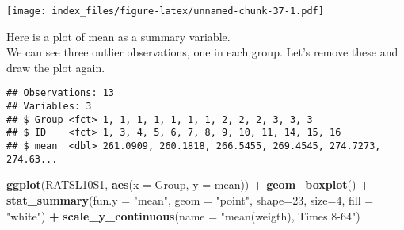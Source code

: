 \documentclass[]{article}
\newenvironment{Shaded}{\begin{snugshade}}{\end{snugshade}}
\newcommand{\KeywordTok}[1]{\textcolor[rgb]{0.13,0.29,0.53}{\textbf{#1}}}
\newcommand{\DataTypeTok}[1]{\textcolor[rgb]{0.13,0.29,0.53}{#1}}
\newcommand{\DecValTok}[1]{\textcolor[rgb]{0.00,0.00,0.81}{#1}}
\newcommand{\StringTok}[1]{\textcolor[rgb]{0.31,0.60,0.02}{#1}}
\newcommand{\CommentTok}[1]{\textcolor[rgb]{0.56,0.35,0.01}{\textit{#1}}}
\newcommand{\OperatorTok}[1]{\textcolor[rgb]{0.81,0.36,0.00}{\textbf{#1}}}
\newcommand{\NormalTok}[1]{#1}
\begin{document}
\texttt{[image: index\_files/figure-latex/unnamed-chunk-37-1.pdf]}

Here is a plot of mean as a summary variable.\\
We can see three outlier observations, one in each group. Let's remove
these and draw the plot again.

\begin{Shaded}
\end{Shaded}

\begin{verbatim}
## Observations: 13
## Variables: 3
## $ Group <fct> 1, 1, 1, 1, 1, 1, 1, 2, 2, 2, 3, 3, 3
## $ ID    <fct> 1, 3, 4, 5, 6, 7, 8, 9, 10, 11, 14, 15, 16
## $ mean  <dbl> 261.0909, 260.1818, 266.5455, 269.4545, 274.7273, 274.63...
\end{verbatim}

\begin{Shaded}
\begin{Highlighting}[]
\KeywordTok{ggplot}\NormalTok{(RATSL10S1, }\KeywordTok{aes}\NormalTok{(}\DataTypeTok{x =}\NormalTok{ Group, }\DataTypeTok{y =}\NormalTok{ mean)) }\OperatorTok{+}
\StringTok{  }\KeywordTok{geom_boxplot}\NormalTok{() }\OperatorTok{+}
\StringTok{  }\KeywordTok{stat_summary}\NormalTok{(}\DataTypeTok{fun.y =} \StringTok{"mean"}\NormalTok{, }\DataTypeTok{geom =} \StringTok{"point"}\NormalTok{, }\DataTypeTok{shape=}\DecValTok{23}\NormalTok{, }\DataTypeTok{size=}\DecValTok{4}\NormalTok{, }\DataTypeTok{fill =} \StringTok{"white"}\NormalTok{) }\OperatorTok{+}
\StringTok{  }\KeywordTok{scale_y_continuous}\NormalTok{(}\DataTypeTok{name =} \StringTok{"mean(weigth), Times 8-64"}\NormalTok{)}
\end{Highlighting}
\end{Shaded}
\end{document}
